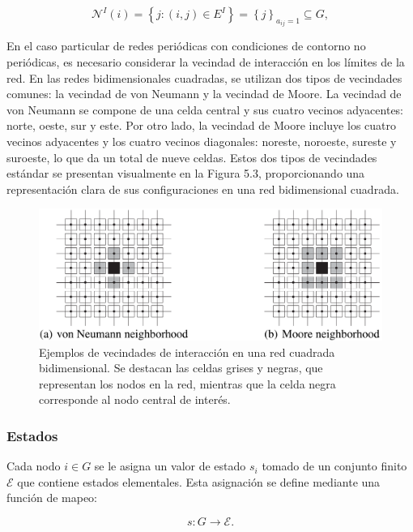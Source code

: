 \begin{equation}\label{eq:43}
	\mathcal{N}^I(i) = \left\{j:(i,j)\in E^I\right\}=\left\{j\right\}_{a_{ij}=1}\subseteq G,
\end{equation}

En el caso particular de redes periódicas con condiciones de contorno no periódicas, es necesario considerar la vecindad de interacción en los límites de la red. En las redes bidimensionales cuadradas, se utilizan dos tipos de vecindades comunes: la vecindad de von Neumann y la vecindad de Moore. La vecindad de von Neumann se compone de una celda central y sus cuatro vecinos adyacentes: norte, oeste, sur y este. Por otro lado, la vecindad de Moore incluye los cuatro vecinos adyacentes y los cuatro vecinos diagonales: noreste, noroeste, sureste y suroeste, lo que da un total de nueve celdas.  Estos dos tipos de vecindades estándar se presentan visualmente en la Figura 5.3, proporcionando una representación clara de sus configuraciones en una red bidimensional cuadrada.


\begin{figure}[h!]
	\centering\includegraphics[width=\imsize]{celdas}
	\caption[Ejemplos de vecindades de interacción en una red cuadrada bidimensional. ]{Ejemplos de vecindades de interacción en una red cuadrada bidimensional. Se destacan las celdas grises y negras, que representan los nodos en la red, mientras que la celda negra corresponde al nodo central de interés.} 	\label{fig:celdas}
\end{figure}


\subsubsection{Estados}


Cada nodo $i\in G$ se le asigna un valor de estado $s_i$ tomado de un conjunto finito $\mathcal{E}$ que contiene estados elementales. Esta asignación se define mediante una función de mapeo:

\begin{equation}
	s:G\rightarrow\mathcal{E}.
\end{equation}


